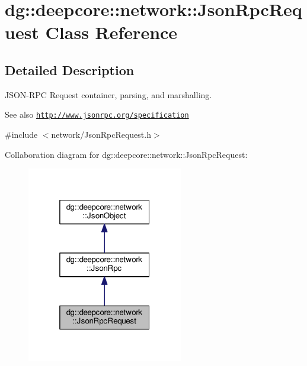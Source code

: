 \hypertarget{classdg_1_1deepcore_1_1network_1_1_json_rpc_request}{}\section{dg\+:\+:deepcore\+:\+:network\+:\+:Json\+Rpc\+Request Class Reference}
\label{classdg_1_1deepcore_1_1network_1_1_json_rpc_request}


\subsection{Detailed Description}
J\+S\+O\+N-\/\+R\+PC Request container, parsing, and marshalling. 

\begin{DoxySeeAlso}{See also}
\href{http://www.jsonrpc.org/specification}{\tt http\+://www.\+jsonrpc.\+org/specification} 
\end{DoxySeeAlso}


{\ttfamily \#include $<$network/\+Json\+Rpc\+Request.\+h$>$}



Collaboration diagram for dg\+:\+:deepcore\+:\+:network\+:\+:Json\+Rpc\+Request\+:
\nopagebreak
\begin{figure}[H]
\begin{center}
\leavevmode
\includegraphics[width=193pt]{classdg_1_1deepcore_1_1network_1_1_json_rpc_request__coll__graph}
\end{center}
\end{figure}

